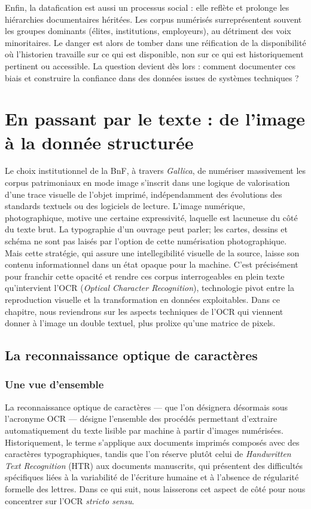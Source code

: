 Enfin, la datafication est aussi un processus social : elle reflète et prolonge les hiérarchies documentaires héritées. Les corpus numérisés surreprésentent souvent les groupes dominants (élites, institutions, employeurs), au détriment des voix minoritaires. Le danger est alors de tomber dans une réification de la disponibilité où l’historien travaille sur ce qui est disponible, non sur ce qui est historiquement pertinent ou accessible. La question devient dès lors : comment documenter ces biais et construire la confiance dans des données issues de systèmes techniques ? 

\chapter{En passant par le texte : de l'image à la donnée structurée}

Le choix institutionnel de la BnF, à travers \emph{Gallica}, de numériser massivement les corpus patrimoniaux en mode image s’inscrit dans une logique de valorisation d'une trace visuelle de l’objet imprimé, indépendamment des évolutions des standards textuels ou des logiciels de lecture. L’image numérique, photographique, motive une certaine expressivité, laquelle est lacuneuse du côté du texte brut. La typographie d'un ouvrage peut parler; les cartes, dessins et schéma ne sont pas laisés par l'option de cette numérisation photographique. Mais cette stratégie, qui assure une intellegibilité visuelle de la source, laisse son contenu informationnel dans un état opaque pour la machine. C’est précisément pour franchir cette opacité et rendre ces corpus interrogeables en plein texte qu’intervient l’OCR (\emph{Optical Character Recognition}), technologie pivot entre la reproduction visuelle et la transformation en données exploitables. Dans ce chapitre, nous reviendrons sur les aspects techniques de l'OCR qui viennent donner à l'image un double textuel, plus prolixe qu'une matrice de pixels.

\section{La reconnaissance optique de caractères}

\subsection{Une vue d’ensemble}

La reconnaissance optique de caractères — que l’on désignera désormais sous l’acronyme OCR — désigne l’ensemble des procédés permettant d’extraire automatiquement du texte lisible par machine à partir d’images numérisées. Historiquement, le terme s’applique aux documents imprimés composés avec des caractères typographiques, tandis que l’on réserve plutôt celui de \emph{Handwritten Text Recognition} (HTR) aux documents manuscrits, qui présentent des difficultés spécifiques liées à la variabilité de l’écriture humaine et à l’absence de régularité formelle des lettres. Dans ce qui suit, nous laisserons cet aspect de côté pour nous concentrer sur l’OCR \emph{stricto sensu}.

